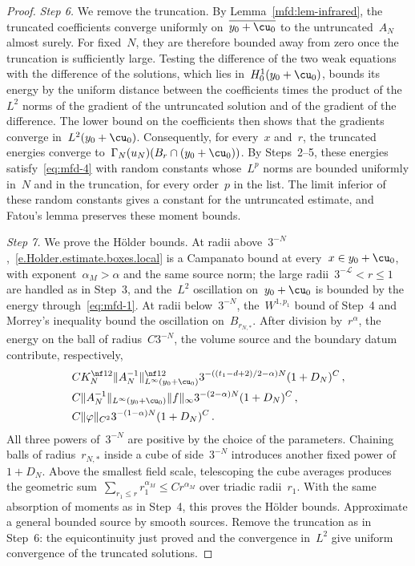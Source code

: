 \documentclass[11pt]{amsart}
\begin{document}
\begin{proof}
\smallskip

\emph{Step 6.} We remove the truncation. By Lemma~\ref{mfd:lem-infrared}, the truncated coefficients converge uniformly on~$\overline{y_0+\cu_0}$ to the untruncated~$A_N$ almost surely. For fixed~$N$, they are therefore bounded away from zero once the truncation is sufficiently large. Testing the difference of the two weak equations with the difference of the solutions, which lies in~$H^1_0(y_0+\cu_0)$, bounds its energy by the uniform distance between the coefficients times the product of the~$L^2$ norms of the gradient of the untruncated solution and of the gradient of the difference. The lower bound on the coefficients then shows that the gradients converge in~$L^2(y_0+\cu_0)$. Consequently, for every~$x$ and~$r$, the truncated energies converge to~$\Gamma_N(u_N)(B_r\cap(y_0+\cu_0))$. By Steps~2--5, these energies satisfy~\eqref{eq:mfd-4} with random constants whose~$L^p$ norms are bounded uniformly in~$N$ and in the truncation, for every order~$p$ in the list. The limit inferior of these random constants gives a constant for the untruncated estimate, and Fatou's lemma preserves these moment bounds.

\smallskip

\emph{Step 7.} We prove the H\"older bounds. At radii above~$3^{-N}$,~\eqref{e.Holder.estimate.boxes.local} is a Campanato bound at every~$x\in y_0+\cu_0$, with exponent~$\alpha_M>\alpha$ and the same source norm; the large radii~$3^{-\mathcal L}<r\leq1$ are handled as in Step~3, and the~$L^2$ oscillation on~$y_0+\cu_0$ is bounded by the energy through~\eqref{eq:mfd-1}. At radii below~$3^{-N}$, the~$W^{1,p_1}$ bound of Step~4 and Morrey's inequality bound the oscillation on~$B_{r_{N,*}}$. After division by~$r^\alpha$, the energy on the ball of radius~$C3^{-N}$, the volume source and the boundary datum contribute, respectively,
\begin{align*}
	&CK_N^{\nf12}\|A_N^{-1}\|_{L^\infty(y_0+\cu_0)}^{\nf12}
	3^{-((t_1-d+2)/2-\alpha)N}(1+D_N)^C\,,\\
	&C\|A_N^{-1}\|_{L^\infty(y_0+\cu_0)}\|f\|_\infty
	3^{-(2-\alpha)N}(1+D_N)^C\,,\\
	&C\|\varphi\|_{C^2}
	3^{-(1-\alpha)N}(1+D_N)^C\,.
\end{align*}
All three powers of~$3^{-N}$ are positive by the choice of the parameters. Chaining balls of radius~$r_{N,*}$ inside a cube of side~$3^{-N}$ introduces another fixed power of~$1+D_N$. Above the smallest field scale, telescoping the cube averages produces the geometric sum~$\sum_{r_1\leq r}r_1^{\alpha_M}\leq Cr^{\alpha_M}$ over triadic radii~$r_1$. With the same absorption of moments as in Step~4, this proves the H\"older bounds. Approximate a general bounded source by smooth sources. Remove the truncation as in Step~6: the equicontinuity just proved and the convergence in~$L^2$ give uniform convergence of the truncated solutions.
\end{proof}
\end{document}
